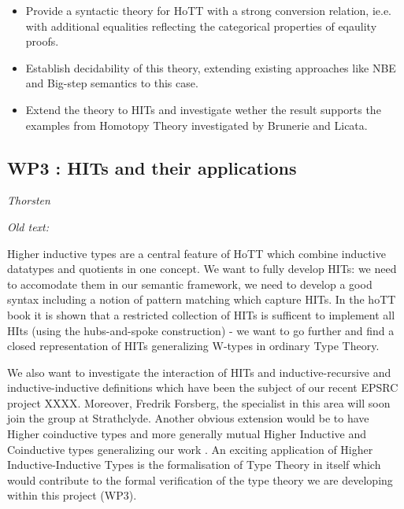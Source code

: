 \documentclass[twocolumn,a4paper,11pt]{article}
\begin{document}
\begin{itemize}

\item Provide a syntactic theory for HoTT with a strong conversion
  relation, ie.e. with additional equalities reflecting the
  categorical properties of eqaulity proofs.

\item Establish decidability of this theory, extending existing
  approaches like NBE and Big-step semantics to this case.

\item Extend the theory to HITs and investigate wether the 
  result supports the examples from Homotopy Theory investigated by
  Brunerie and Licata.

\end{itemize}

\subsection*{WP3 : HITs and their applications} 

\emph{Thorsten}

\emph{Old text:}

Higher inductive types are a central feature of HoTT which combine
inductive datatypes and quotients in one concept. 
%
%
We want to fully develop HITs: we need to accomodate them in our
semantic framework, we need to develop a good syntax including a
notion of pattern matching which capture HITs. In the hoTT book it is
shown that a restricted collection of HITs is sufficent to implement
all HIts (using the hubs-and-spoke construction) - we want to go
further and find a closed representation of HITs generalizing W-types
in ordinary Type Theory.

We also want to investigate the interaction of HITs and
inductive-recursive and inductive-inductive definitions which have
been the subject of our recent EPSRC project XXXX. Moreover, Fredrik
Forsberg, the specialist in this area will soon join the group at
Strathclyde. Another obvious extension would be to have Higher
coinductive types and more generally mutual Higher Inductive and
Coinductive types generalizing our work \cite{txa-nisse}. An exciting
application of Higher Inductive-Inductive Types is the formalisation
of Type Theory in itself which would contribute to the formal
verification of the type theory we are developing within this project
(WP3).
\end{document}
